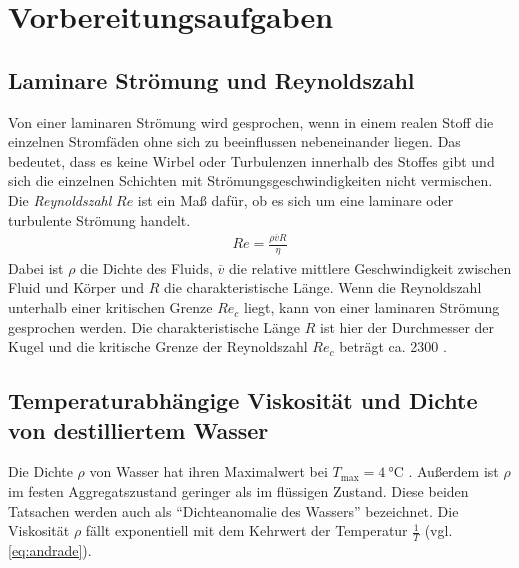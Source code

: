 \section{Vorbereitungsaufgaben}
\subsection{Laminare Strömung und Reynoldszahl}
\label{sec:vorbereitung}
Von einer laminaren Strömung wird gesprochen, wenn in einem realen Stoff
die einzelnen Stromfäden ohne sich zu beeinflussen nebeneinander liegen. Das bedeutet, dass es keine Wirbel oder
Turbulenzen innerhalb des Stoffes gibt und sich die einzelnen Schichten mit Strömungsgeschwindigkeiten nicht vermischen.
Die \textit{Reynoldszahl} $Re$ ist ein Maß dafür, ob es sich um eine laminare oder turbulente Strömung handelt.
\noindent
\begin{align}
    Re = \frac{\rho \overline{v} R}{\eta}
    \label{eq:reynold}
\end{align}
Dabei ist $\rho$ die Dichte des Fluids, $\overline{v}$ die relative mittlere Geschwindigkeit zwischen Fluid und Körper und
$R$ die charakteristische Länge.
Wenn die Reynoldszahl unterhalb einer kritischen Grenze $Re_c$ liegt, kann von einer laminaren Strömung gesprochen werden.
Die charakteristische Länge $R$ ist hier der Durchmesser der Kugel und die kritische Grenze der Reynoldszahl $Re_c$ beträgt ca. 2300 \cite*[]{geschke}.


\subsection{Temperaturabhängige Viskosität und Dichte von destilliertem Wasser}
Die Dichte $\rho$ von Wasser hat ihren Maximalwert bei $T_\text{max} = \qty[]{4}{\degreeCelsius}$ \cite*[]{geschke}.
Außerdem ist $\rho$ im festen Aggregatszustand geringer als im flüssigen Zustand. 
Diese beiden Tatsachen werden auch als \enquote{Dichteanomalie des Wassers} bezeichnet\cite*[]{demtroeder}.
Die Viskosität $\rho$ fällt exponentiell mit dem Kehrwert der Temperatur $\frac{1}{T}$ (vgl. \eqref{eq:andrade}).


